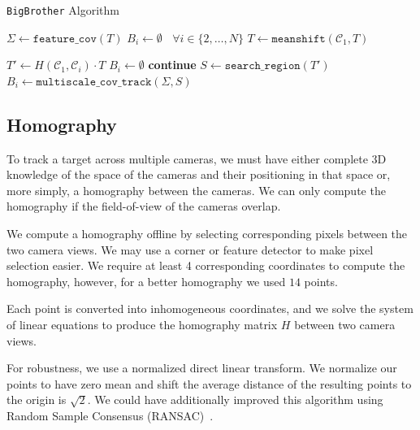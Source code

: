 \documentclass{article}
\begin{document}
\begin{algorithm}
\caption{\texttt{BigBrother} Algorithm}\label{algo:bigbrother}
\begin{algorithmic}[1]
\State $\Sigma\gets \mathtt{feature\_cov}(T)$
\State $B_i\gets\emptyset~~~~\forall i\in\{2,\dots,N\}$
    \State $T\gets \mathtt{meanshift}(\mathcal{C}_1, T)$

        \State $T'\gets H(\mathcal{C}_1, \mathcal{C}_i)\cdot T$
            \State $B_i\gets\emptyset$
            \State \textbf{continue}
        \EndIf
        \State $S\gets\mathtt{search\_region}(T')$
        \State $B_i\gets\mathtt{multiscale\_cov\_track}(\Sigma, S)$
    \EndFor
\EndWhile
\EndProcedure
\end{algorithmic}
\end{algorithm}

\subsection{Homography}
\label{sec:homography}
To track a target across multiple cameras, we must have either complete 3D knowledge of the space of the cameras and their positioning in that space or, more simply, a homography between the cameras. We can only compute the homography if the field-of-view of the cameras overlap.

We compute a homography offline by selecting corresponding pixels between the two camera views. We may use a corner or feature detector to make pixel selection easier. We require at least 4 corresponding coordinates to compute the homography, however, for a better homography we used $14$ points.

Each point is converted into inhomogeneous coordinates, and we solve the system of linear equations to produce the homography matrix $H$ between two camera views.

For robustness, we use a normalized direct linear transform. We normalize our points to have zero mean and shift the average distance of the resulting points to the origin is $\sqrt{2}$. We could have additionally improved this algorithm using Random Sample Consensus (RANSAC)~\cite{fischler1981random}.
\end{document}

